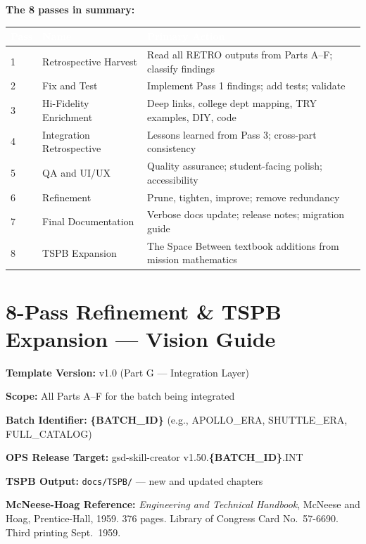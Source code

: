 \documentclass[11pt,letterpaper]{article}
\newcommand{\stageheader}[2]{%
  \noindent\colorbox{#2}{\makebox[\textwidth][l]{%
    \textcolor{white}{\bfseries\sffamily\hspace{6pt}#1\hspace{6pt}}}}%
  \vspace{0.5em}\par%
}
\newcommand{\metafield}[2]{\textbf{\sffamily #1} #2\par}
\newcommand{\param}[1]{\textcolor{paramred}{\textbf{\{#1\}}}}
\newcommand{\tableheader}[1]{\textbf{\sffamily\textcolor{white}{#1}}}
\begin{document}
\textbf{The 8 passes in summary:}

\begin{center}
\begin{tabularx}{\textwidth}{C{1cm}L{4.5cm}X}
\toprule
{}
\tableheader{Pass} & \tableheader{Name} & \tableheader{Primary Action} \\
 & Retrospective Harvest & Read all RETRO outputs from Parts A--F; classify findings \\
2 & Fix and Test & Implement Pass 1 findings; add tests; validate \\
3 & Hi-Fidelity Enrichment & Deep links, college dept mapping, TRY examples, DIY, code \\
4 & Integration Retrospective & Lessons learned from Pass 3; cross-part consistency \\
5 & QA and UI/UX & Quality assurance; student-facing polish; accessibility \\
6 & Refinement & Prune, tighten, improve; remove redundancy \\
7 & Final Documentation & Verbose docs update; release notes; migration guide \\
8 & TSPB Expansion & The Space Between textbook additions from mission mathematics \\
\bottomrule
\end{tabularx}
\end{center}

\newpage
\tableofcontents
\newpage

\stageheader{STAGE 1 --- VISION DOCUMENT}{primary}

\section{8-Pass Refinement \& TSPB Expansion --- Vision Guide}

\metafield{Template Version:}{v1.0 (Part G --- Integration Layer)}
\metafield{Scope:}{All Parts A--F for the batch being integrated}
\metafield{Batch Identifier:}{\param{BATCH\_ID} (e.g., APOLLO\_ERA, SHUTTLE\_ERA, FULL\_CATALOG)}
\metafield{OPS Release Target:}{gsd-skill-creator v1.50.\param{BATCH\_ID}.INT}
\metafield{TSPB Output:}{\texttt{docs/TSPB/} --- new and updated chapters}
\metafield{McNeese-Hoag Reference:}{\textit{Engineering and Technical Handbook}, McNeese and Hoag, Prentice-Hall, 1959. 376 pages. Library of Congress Card No.\ 57-6690. Third printing Sept.\ 1959.}
\end{document}
